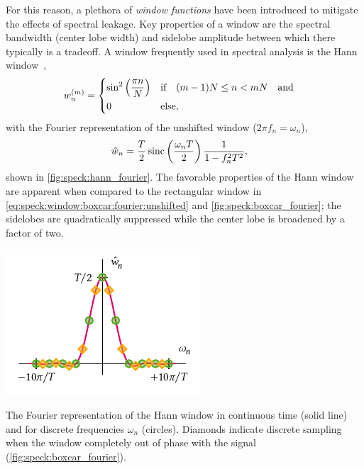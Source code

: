 For this reason, a plethora of \emph{window functions} have been introduced to mitigate the effects of spectral leakage.
Key properties of a window are the spectral bandwidth (center lobe width) and sidelobe amplitude between which there typically is a tradeoff.
A window frequently used in spectral analysis is the Hann window~\cite{Nuttall1981},
\begin{align}\label{eq:speck:window:hann}
    w_n\gth{m} =
    \begin{dcases}
        \sin^2\left(\frac{\pi n}{N}\right) &\qif* (m - 1)N\leq n < mN\qand \\
        0 &\text{else},
    \end{dcases}
\end{align}
with the Fourier representation of the unshifted window ($2\pi f_n = \omega_n$),
\begin{align}\label{eq:speck:window:hann:fourier_unshifted}
    \hat{w}_n &= \frac{T}{2}\operatorname{sinc}\left(\frac{\omega_n T}{2}\right) \frac{1}{1 - f_n^2 T^2},
\end{align}
shown in \cref{fig:speck:hann_fourier}.
The favorable properties of the Hann window are apparent when compared to the rectangular window in \cref{eq:speck:window:boxcar:fourier:unshifted} and \cref{fig:speck:boxcar_fourier}; the sidelobes are quadratically suppressed while the center lobe is broadened by a factor of two.

\begin{marginfigure}[*-3]
    \centering
    \includegraphics{img/pdf/spectrometer/hann}
    \caption[]{
        The Fourier representation of the Hann window in continuous time (solid line) and for discrete frequencies $\omega_n$ (circles).
        Diamonds indicate discrete sampling when the window completely out of phase with the signal (\cf \cref{fig:speck:boxcar_fourier}).
    }
    \label{fig:speck:hann_fourier}
\end{marginfigure}

